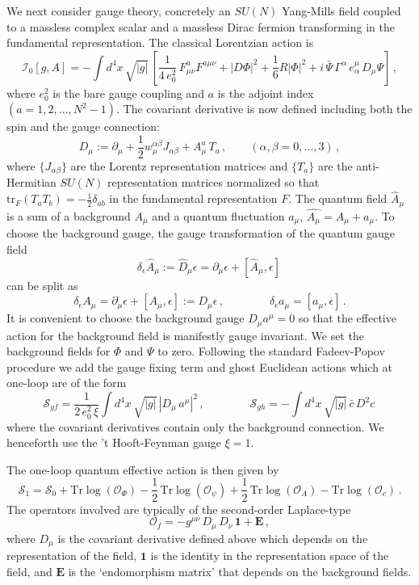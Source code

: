 \documentclass[12pt,a4paper]{article}
\newcommand{\be}{\begin{equation}}
\newcommand{\ee}{\end{equation}}
\newcommand{\cI}{\mathcal{I}}
\newcommand{\cO}{\mathcal{O}}
\newcommand{\cS}{\mathcal{S}}
\renewcommand{\a}{\alpha}
\renewcommand{\b}{\beta}
\newcommand{\e}{\epsilon}
\newcommand{\m}{\mu}
\newcommand{\n}{\nu}
\newcommand{\1}{{\textbf{1}}}
\newcommand{\half}{\frac{1}{2}}
\newcommand{\pa}{\partial}
\newcommand{\Tr}{\mbox{Tr}}
\newcommand{\tr}{\mbox{tr}}
\newcommand{\+}{{\,+ \,}}
\begin{document}
We  next consider gauge theory, concretely an $SU(N)$  Yang-Mills field coupled to a massless complex scalar and a  massless Dirac fermion transforming in the fundamental representation. The  classical Lorentzian action is
\be\label{action-L}
\cI_0[g, A] =  - \int   d^4x \, \sqrt{|g|} \, \left[\frac{1}{4\,e_0^2}  \, F^{a}_{\mu\nu} F^{a\mu\nu} 
+ \left|D\Phi\right|^2  +\frac{1}{6}R\left|\Phi\right|^2 +  i \,\bar \Psi\, \Gamma^\a\, e_\a^\mu \,  D_\mu\Psi \right] \, ,
\ee
where $e_0^{2}$ is the bare gauge coupling and   $a$  is the adjoint index $( a= 1, 2, \ldots ,N^{2}-1 )$. 
The covariant derivative is now defined including both the spin and the gauge connection:
\be
D_{\mu}:=  \partial_{\mu} + \half w_{\mu} ^{\a\b} J_{\a\b}+ A^{a}_{\mu} \,T_{a}\, , \qquad  (\a, \b = 0, \ldots,  3)\,  ,
\ee
where $\{J_{\a\b}\}$ are the Lorentz representation matrices and
$\{ T_{a} \}$ are the anti-Hermitian $SU(N)$ representation matrices   normalized so that $\tr_{F} ({T_{a} T_{b}}) = -\half \delta_{ab}$ in the fundamental representation $F$.
The quantum field $\hat{A}_\mu$ is a sum of a  background $A_\mu$ and a  quantum fluctuation $a_\mu$, 
$\hat{A_{\m}} = A_{\m} + a_{\m}$.
To choose the background gauge, the gauge transformation of the quantum gauge field 
\be
\delta_{\e} \hat{A}_\mu := \hat D_{\mu} \e = \pa_\mu \e + [\hat{A}_\mu,\e]\, 
\ee
can be split as
\be
\delta_{\e} A_\mu = \pa_\mu \e + \left[A_\mu,\e\right] := D_{\m}\e \, ,\qquad\qquad
\delta_{\e} a_\mu = \left[a_\mu,\e\right]\, .
\ee
It is convenient to choose the background gauge $D_{\mu}a^{\mu}=0$ so that the effective action for the background field is manifestly gauge invariant. We set the background fields for $\Phi$ and $\Psi$ to zero. Following the standard Fadeev-Popov procedure we add the gauge fixing term and ghost Euclidean actions which at one-loop are of  the form
\be
\cS_{gf} = \frac{1}{2\,e_0^2\,\xi} \int   d^4x \, \sqrt{|g|} \, \left| D_\m \,a^\m\right|^2\, , \qquad\qquad \cS_{gh} = - \int   d^4x \, \sqrt{|g|} \, \bar{c}\,D^2 c \, 
\ee
where the covariant derivatives contain only the background connection. We henceforth use the ’t Hooft-Feynman gauge $\xi=1$.

The one-loop quantum effective action is then given by
\be\label{trlog1}
\cS_{1} = \cS_0 +  \Tr \log\left(\cO_\Phi\right)- \half\,\Tr \log\left(\cO_\psi\right) + \frac{1}{2}\,\Tr \log\left(\cO_{A}\right)- \Tr \log\left(\cO_{c}\right)\, .
\ee
The operators involved are typically of the second-order Laplace-type
 \be
\cO_{f}=-g^{\m\n}\,D_\m\,D_\n\, \textbf{1}+\textbf{E}\, ,
\ee
where $D_\m$ is the covariant derivative defined above which depends on the representation of the field, $\textbf{1}$ is the identity in the  representation space of the field, and $\textbf{E}$ is the `endomorphism matrix’ that depends on the background fields.
\end{document}
